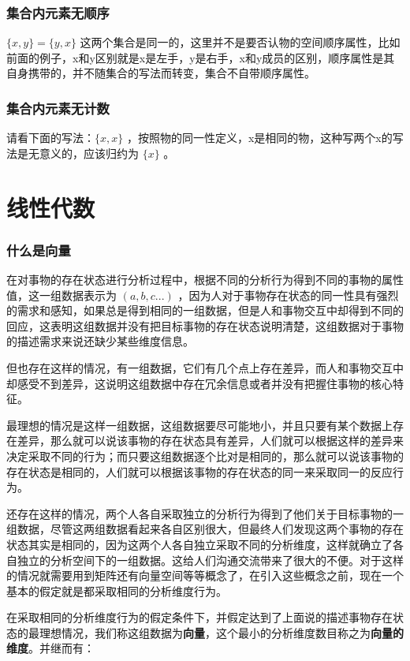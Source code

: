 \documentclass[12pt,oneside]{book}
\begin{document}
\section{集合内元素无顺序}
$\{x, y\} =\{y, x\}$ 这两个集合是同一的，这里并不是要否认物的空间顺序属性，比如前面的例子，x和y区别就是x是左手，y是右手，x和y成员的区别，顺序属性是其自身携带的，并不随集合的写法而转变，集合不自带顺序属性。

\section{集合内元素无计数}
请看下面的写法：$\{x, x\}$ ，按照物的同一性定义，x是相同的物，这种写两个x的写法是无意义的，应该归约为 $\{x\}$ 。


\part{线性代数}
\section{什么是向量}
在对事物的存在状态进行分析过程中，根据不同的分析行为得到不同的事物的属性值，这一组数据表示为 $(a, b, c...)$ ，因为人对于事物存在状态的同一性具有强烈的需求和感知，如果总是得到相同的一组数据，但是人和事物交互中却得到不同的回应，这表明这组数据并没有把目标事物的存在状态说明清楚，这组数据对于事物的描述需求来说还缺少某些维度信息。

但也存在这样的情况，有一组数据，它们有几个点上存在差异，而人和事物交互中却感受不到差异，这说明这组数据中存在冗余信息或者并没有把握住事物的核心特征。

最理想的情况是这样一组数据，这组数据要尽可能地小，并且只要有某个数据上存在差异，那么就可以说该事物的存在状态具有差异，人们就可以根据这样的差异来决定采取不同的行为；而只要这组数据逐个比对是相同的，那么就可以说该事物的存在状态是相同的，人们就可以根据该事物的存在状态的同一来采取同一的反应行为。

还存在这样的情况，两个人各自采取独立的分析行为得到了他们关于目标事物的一组数据，尽管这两组数据看起来各自区别很大，但最终人们发现这两个事物的存在状态其实是相同的，因为这两个人各自独立采取不同的分析维度，这样就确立了各自独立的分析空间下的一组数据。这给人们沟通交流带来了很大的不便。对于这样的情况就需要用到矩阵还有向量空间等等概念了，在引入这些概念之前，现在一个基本的假定就是都采取相同的分析维度行为。

在采取相同的分析维度行为的假定条件下，并假定达到了上面说的描述事物存在状态的最理想情况，我们称这组数据为\textbf{向量}，这个最小的分析维度数目称之为\textbf{向量的维度}。并继而有：
\end{document}
